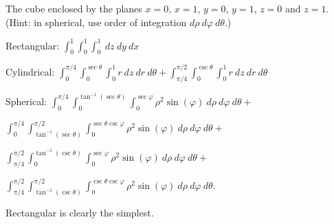 {The cube enclosed by the planes $x=0$, $x=1$, $y=0$, $y=1$, $z=0$ and $z=1$. (Hint: in spherical, use order of integration $d\rho\ d\varphi\ d\theta$.)
}
{Rectangular: $\int_{0}^{1}\int_{0}^{1}\int_{0}^{1}\ dz\ dy\ dx$

Cylindrical: $\int_0^{\pi/4}\int_0^{\sec\theta}\int_{0}^{1}r\ dz\ dr\ d\theta + \int_{\pi/4}^{\pi/2}\int_0^{\csc\theta}\int_{0}^{1}r\ dz\ dr\ d\theta$

Spherical: $\int _0^{\pi/4}\int _0^{\tan ^{-1}(\sec \theta)}\int _0^{\sec \varphi}\rho ^2 \sin
   (\varphi)\ d\rho\ d\varphi\ d \theta +$
	
	$\int _0^{\pi/4}\int _{\tan ^{-1}(\sec \theta)}^{\pi/2}\int _0^{\sec\theta\csc\varphi}\rho ^2 \sin
   (\varphi)\ d\rho\ d\varphi\ d \theta +$
	
	$\int _{\pi/4}^{\pi/2}\int _0^{\tan ^{-1}(\csc \theta)}\int _0^{\sec\varphi}\rho ^2 \sin
   (\varphi)\ d\rho\ d\varphi\ d \theta +$
	
	$\int _{\pi/4}^{\pi/2}\int _{\tan ^{-1}(\csc \theta)}^{\pi/2}\int _0^{\csc\theta\csc\varphi}\rho ^2 \sin
   (\varphi)\ d\rho\ d\varphi\ d \theta.$

Rectangular is clearly the simplest.
}
